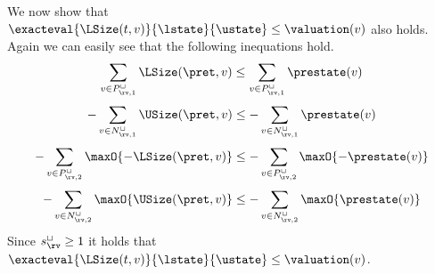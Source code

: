 We now show that $\exacteval{\LSize(t, v)}{\lstate}{\ustate} \leq \valuation(v)$ also holds.
Again we can easily see that the following inequations hold.
\[ \sum_{v \in P_{\rv,1}^\sqcup} \LSize(\pret, v) \leq \sum_{v \in P_{\rv,1}^\sqcup} \prestate(v) \]
\[ - \sum_{v \in N_{\rv,1}^\sqcup} \USize(\pret, v) \leq - \sum_{v \in N_{\rv,1}^\sqcup} \prestate(v) \]
\[ - \sum_{v \in P_{\rv,2}^\sqcup} \maxO{-\LSize(\pret, v)} \leq - \sum_{v \in P_{\rv,2}^\sqcup} \maxO{-\prestate(v)} \]
\[ - \sum_{v \in N_{\rv,2}^\sqcup} \maxO{\USize(\pret, v)} \leq - \sum_{v \in N_{\rv,2}^\sqcup} \maxO{\prestate(v)} \]
Since $s^\sqcup_\rv \geq 1$ it holds that $\exacteval{\LSize(t, v)}{\lstate}{\ustate} \leq \valuation(v)$.

